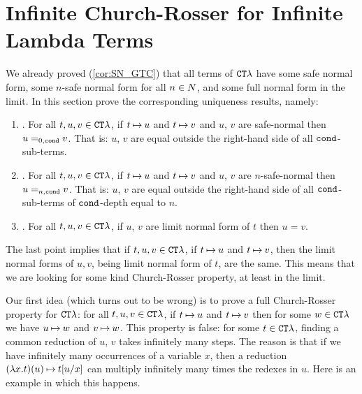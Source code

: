 

\newpage

\section{Infinite Church-Rosser for Infinite Lambda Terms}
\label{section-safe-church-rosser}

We already proved (\ref{cor:SN_GTC}) that all terms of ${ {\tt CT}\lambda}$ have some
safe normal form, some $n$-safe normal form
for all $n \in {N}$, and some full normal form in the limit. 
In this section prove the corresponding uniqueness results,  namely:

\begin{enumerate}
\item
\emph{\bf{}}.
For all $t,u,v \in { {\tt CT}\lambda}$, if $t \mathbin{\mapsto} u$ and $t \mathbin{\mapsto} v$ and $u$, $v$ are safe-normal 
then $u =_{0,{\tt cond}} v$. That is: $u$, $v$ are equal outside the right-hand side of all ${\tt cond}$-sub-terms.
\item
\emph{\bf{}}.
For all $t,u,v \in { {\tt CT}\lambda}$, if $t \mathbin{\mapsto} u$ and $t \mathbin{\mapsto} v$ and $u$, $v$ are $n$-safe-normal 
then $u =_{n,{\tt cond}} v$. That is: $u$, $v$ are equal outside the right-hand side of all ${\tt cond}$-sub-terms
of ${\tt cond}$-depth equal to $n$.
\item
\emph{\bf{}}.
For all $t,u,v \in { {\tt CT}\lambda}$, if $u$, $v$ are limit normal form of $t$ then $u = v$.
\end{enumerate}

The last point implies that if $t,u,v \in { {\tt CT}\lambda}$, if $t \mathbin{\mapsto} u$ and $t \mathbin{\mapsto} v$,
then the limit normal forms of $u,v$, being limit normal form of $t$, are the same. This means that we
are looking for some kind Church-Rosser property, at least in the limit.

Our first idea (which turns out to be wrong) 
is to prove a full Church-Rosser property for ${ {\tt CT}\lambda}$: 
for all $t,u,v \in { {\tt CT}\lambda}$, if $t \mathbin{\mapsto} u$ and $t \mathbin{\mapsto} v$ then for some $w \in { {\tt CT}\lambda}$
we have $u \mathbin{\mapsto} w$ and $v \mathbin{\mapsto} w$. This property is false: for some $t \in { {\tt CT}\lambda}$, finding a 
common reduction of $u$, $v$ takes infinitely many steps. The reason is that if we have infinitely many
occurrences of a variable $x$, then a reduction $(\lambda x.t)(u) \mathbin{\mapsto} t[u/x]$ can multiply
infinitely many times the redexes in $u$. Here is an example in which this happens.

